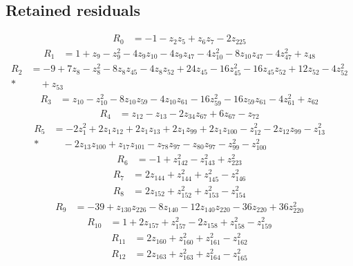 \documentclass[11pt]{article}
\theoremstyle{remark}
\begin{document}
\subsection*{Retained residuals}
\begin{align*}
R_{0}&=-1-z_{2} z_{5}+z_{6} z_{7}-2z_{225}
\end{align*}
\begin{align*}
R_{1}&=1+z_{9}-z_{9}^{2}-4z_{9} z_{10}-4z_{9} z_{47}-4z_{10}^{2}-8z_{10} z_{47}-4z_{47}^{2}+z_{48}
\end{align*}
\begin{align*}
R_{2}&=-9+7z_{8}-z_{8}^{2}-8z_{8} z_{45}-4z_{8} z_{52}+24z_{45}-16z_{45}^{2}-16z_{45} z_{52}+12z_{52}-4z_{52}^{2}\\*
&\quad{}+z_{53}
\end{align*}
\begin{align*}
R_{3}&=z_{10}-z_{10}^{2}-8z_{10} z_{59}-4z_{10} z_{61}-16z_{59}^{2}-16z_{59} z_{61}-4z_{61}^{2}+z_{62}
\end{align*}
\begin{align*}
R_{4}&=z_{12}-z_{13}-2z_{34} z_{67}+6z_{67}-z_{72}
\end{align*}
\begin{align*}
R_{5}&=-2z_{1}^{2}+2z_{1} z_{12}+2z_{1} z_{13}+2z_{1} z_{99}+2z_{1} z_{100}-z_{12}^{2}-2z_{12} z_{99}-z_{13}^{2}\\*
&\quad{}-2z_{13} z_{100}+z_{17} z_{101}-z_{78} z_{97}-z_{80} z_{97}-z_{99}^{2}-z_{100}^{2}
\end{align*}
\begin{align*}
R_{6}&=-1+z_{142}^{2}-z_{143}^{2}+z_{223}^{2}
\end{align*}
\begin{align*}
R_{7}&=2z_{144}+z_{144}^{2}+z_{145}^{2}-z_{146}^{2}
\end{align*}
\begin{align*}
R_{8}&=2z_{152}+z_{152}^{2}+z_{153}^{2}-z_{154}^{2}
\end{align*}
\begin{align*}
R_{9}&=-39+z_{130} z_{226}-8z_{140}-12z_{140} z_{220}-36z_{220}+36z_{220}^{2}
\end{align*}
\begin{align*}
R_{10}&=1+2z_{157}+z_{157}^{2}-2z_{158}+z_{158}^{2}-z_{159}^{2}
\end{align*}
\begin{align*}
R_{11}&=2z_{160}+z_{160}^{2}+z_{161}^{2}-z_{162}^{2}
\end{align*}
\begin{align*}
R_{12}&=2z_{163}+z_{163}^{2}+z_{164}^{2}-z_{165}^{2}
\end{align*}
\end{document}

